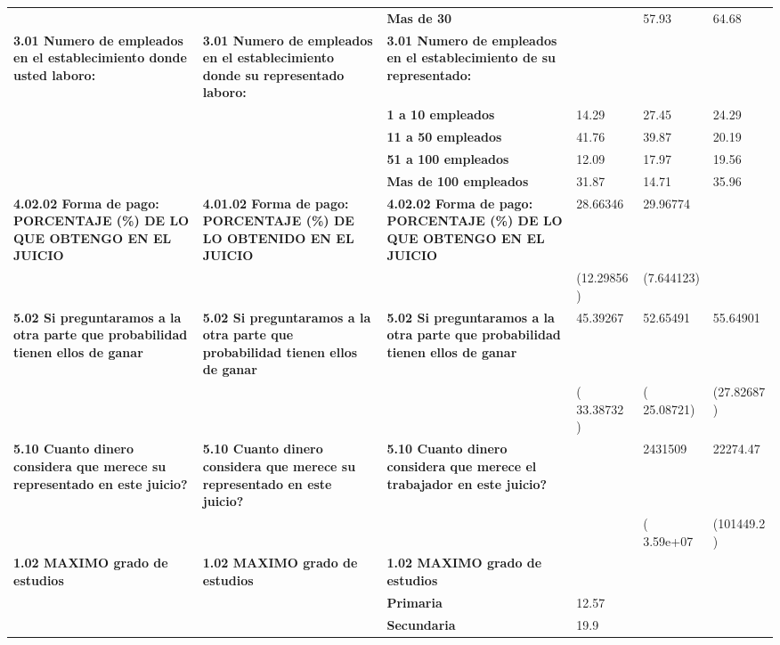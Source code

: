 \begin{longtable}{p{3cm}p{3cm}p{3cm}p{1.5cm}p{1.5cm}p{1.5cm}}
\textbf{ } & \textbf{ } & \textbf{Mas de 30 } &       & 57.93 & 64.68 \\
\textbf{3.01 Numero de empleados en el establecimiento donde usted laboro:} & \textbf{3.01 Numero de empleados en el establecimiento donde su representado laboro:} & \textbf{3.01 Numero de empleados en el establecimiento de su representado:} &       &       &  \\
\textbf{ } & \textbf{ } & \textbf{    1 a 10 empleados } & 14.29 & 27.45 & 24.29 \\
\textbf{ } & \textbf{ } & \textbf{   11 a 50 empleados } & 41.76 & 39.87 & 20.19 \\
\textbf{ } & \textbf{ } & \textbf{  51 a 100 empleados } & 12.09 & 17.97 & 19.56 \\
\textbf{ } & \textbf{ } & \textbf{Mas de 100 empleados } & 31.87 & 14.71 & 35.96 \\
\textbf{4.02.02 Forma de pago: PORCENTAJE (\%) DE LO QUE OBTENGO EN EL JUICIO} & \textbf{4.01.02 Forma de pago: PORCENTAJE (\%) DE LO OBTENIDO EN EL JUICIO} & \textbf{4.02.02 Forma de pago: PORCENTAJE (\%) DE LO QUE OBTENGO EN EL JUICIO} & 28.66346 & 29.96774 &  \\
\textbf{ } & \textbf{ } & \textbf{ } & (12.29856  ) & (7.644123) &  \\
\textbf{5.02 Si preguntaramos a la otra parte que probabilidad tienen ellos de ganar} & \textbf{5.02 Si preguntaramos a la otra parte que probabilidad tienen ellos de ganar} & \textbf{5.02 Si preguntaramos a la otra parte que probabilidad tienen ellos de ganar} & 45.39267 & 52.65491 & 55.64901 \\
\textbf{ } & \textbf{ } & \textbf{ } & ( 33.38732 ) & ( 25.08721) & (27.82687 ) \\
\textbf{5.10 Cuanto dinero considera que merece su representado en este juicio?} & \textbf{5.10 Cuanto dinero considera que merece su representado en este juicio?} & \textbf{5.10 Cuanto dinero considera que merece el trabajador en este juicio?} &       & 2431509 & 22274.47 \\
\textbf{ } & \textbf{ } & \textbf{ } &       & ( 3.59e+07  & (101449.2 ) \\
\textbf{1.02 MAXIMO grado de estudios} & \textbf{1.02 MAXIMO grado de estudios} & \textbf{1.02 MAXIMO grado de estudios} &       &       &  \\
\textbf{ } & \textbf{ } & \multicolumn{1}{l}{\textbf{Primaria }} & 12.57 &       &  \\
\textbf{ } & \textbf{ } & \multicolumn{1}{l}{\textbf{Secundaria }} & 19.9  &       &  \\

\end{longtable}
